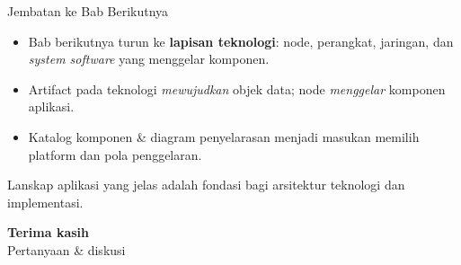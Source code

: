 \documentclass[aspectratio=169, table]{beamer}
\newcommand{\takeaway}[1]{%
  \vspace{4pt}
  {\footnotesize #1}
}
\begin{document}
\begin{frame}{Jembatan ke Bab Berikutnya}
  \vspace{8pt}
  \begin{itemize}
    \item Bab berikutnya turun ke \textbf{lapisan teknologi}: node, perangkat,
          jaringan, dan \emph{system software} yang menggelar komponen.
    \item Artifact pada teknologi \emph{mewujudkan} objek data; node
          \emph{menggelar} komponen aplikasi.
    \item Katalog komponen \& diagram penyelarasan menjadi masukan memilih
          platform dan pola penggelaran.
  \end{itemize}
  \takeaway{Lanskap aplikasi yang jelas adalah fondasi bagi arsitektur teknologi
  dan implementasi.}
\end{frame}

\begin{frame}{\hfill}
  \centering
  \Huge{\textbf{Terima kasih}}\\[8pt]
  \normalsize Pertanyaan \& diskusi
\end{frame}
\end{document}
